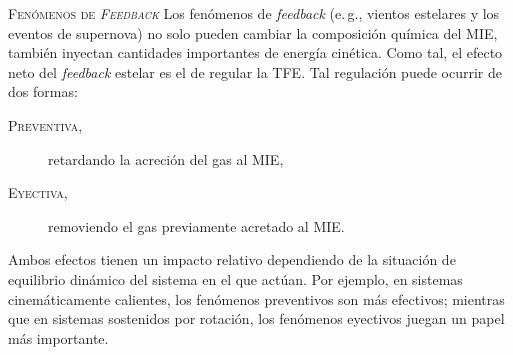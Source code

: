\documentclass[xcolor=dvipsnames,4pt,hyperref={colorlinks,citecolor=black,linkcolor=black,urlcolor=black}]{beamer}
\begin{document}
\begin{frame}[allowframebreaks]{\textsc{Fenómenos de \emph{Feedback}}}
%
Los fenómenos de \emph{feedback} (e.\,g., vientos estelares y los eventos de supernova) no solo
pueden cambiar la composición química del MIE, también inyectan cantidades importantes de energía
cinética. Como tal, el efecto neto del \emph{feedback} estelar es el de regular la TFE. Tal
regulación puede ocurrir de dos formas:
%
\begin{description}
\item[\textsc{Preventiva,}] retardando la acreción del gas al MIE,
\item[\textsc{Eyectiva,}] removiendo el gas previamente acretado al MIE.
\end{description}
%
Ambos efectos tienen un impacto relativo dependiendo de la situación de equilibrio dinámico del
sistema en el que actúan. Por ejemplo, en sistemas cinemáticamente calientes, los fenómenos
preventivos son más efectivos; mientras que en sistemas sostenidos por rotación, los fenómenos
eyectivos juegan un papel más importante.


\end{frame}
\end{document}
